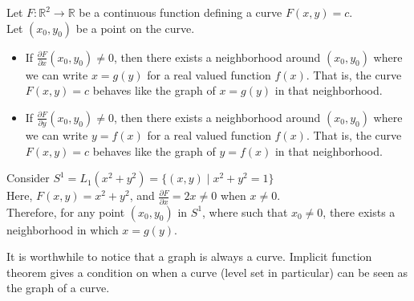 \vspace{0.4cm}
\begin{theorem}
    Let $F:\mathbb{R}^2\to\mathbb{R}$ be a continuous function defining a curve $F(x,y)=c$.\\ 
    Let $(x_0,y_0)$ be a point on the curve.
    \begin{itemize}
        \item If $\frac{\partial F}{\partial x}(x_0,y_0)\neq 0$, then there exists a neighborhood around $(x_0,y_0)$ where we can write $x=g(y)$ for a real valued function $f(x)$. That is, the curve $F(x,y)=c$ behaves like the graph of $x=g(y)$ in that neighborhood.
        \item If $\frac{\partial F}{\partial y}(x_0,y_0)\neq 0$, then there exists a neighborhood around $(x_0,y_0)$ where we can write $y=f(x)$ for a real valued function $f(x)$. That is, the curve $F(x,y)=c$ behaves like the graph of $y=f(x)$ in that neighborhood.
    \end{itemize}
\end{theorem}
\vspace{0.4cm}
\begin{eg}
    Consider $S^1=L_1(x^2+y^2)=\{(x,y)\mid x^2+y^2=1\}$\\ 
    Here, $F(x,y)=x^2+y^2$, and $\frac{\partial F}{\partial x}=2x\neq 0$ when $x\neq0$.\\ 
    Therefore, for any point $(x_0,y_0)$ in $S^1$, where such that $x_0\neq0$, there exists a neighborhood in which $x=g(y)$.
\end{eg}
\vspace{0.4cm}
\begin{note}
    It is worthwhile to notice that a graph is always a curve. Implicit function theorem gives a condition on when a curve (level set in particular) can be seen as the graph of a curve.
\end{note}
\vspace{0.4cm}

